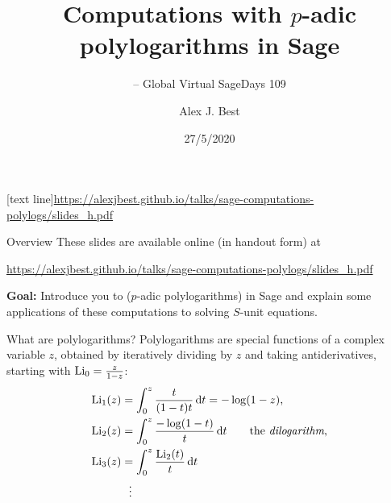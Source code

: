 \author{Alex J. Best}
\date{27/5/2020}
\title{Computations with $p$-adic polylogarithms in Sage}
\subtitle{-- Global Virtual SageDays 109}
[text line]{\url{https://alexjbest.github.io/talks/sage-computations-polylogs/slides_h.pdf}}



\begin{frame}
    \titlepage


\end{frame}


\begin{frame}{Overview}
    These slides are available online (in handout form) at

    {\url{https://alexjbest.github.io/talks/sage-computations-polylogs/slides_h.pdf}}

    \pause

    \textbf{Goal:}  Introduce you to ($p$-adic polylogarithms) in Sage and explain some applications of these computations to solving $S$-unit equations.

\end{frame}

\begin{frame}{What are polylogarithms?}
    Polylogarithms are special functions of a complex variable $z$, obtained by iteratively dividing by $z$ and taking antiderivatives, starting with $\operatorname{Li}_0 = \frac{z}{1-z}$:
    \begin{align*}
        \operatorname{Li}_1 (z) &= \int_0^z \frac{t}{(1-t)t} \mathop{}\!\mathrm{d} t= - \log(1-z)\text,\\
        \operatorname{Li}_2 (z) &= \int_0^z \frac{-\log(1-t)}t \mathop{}\!\mathrm{d} t \qquad \text{the \emph{dilogarithm},}\\
        \operatorname{Li}_3 (z) &= \int_0^z \frac{\operatorname{Li}_2(t)}t \mathop{}\!\mathrm{d} t\\
        &\ \ \vdots
    \end{align*}
\end{frame}


